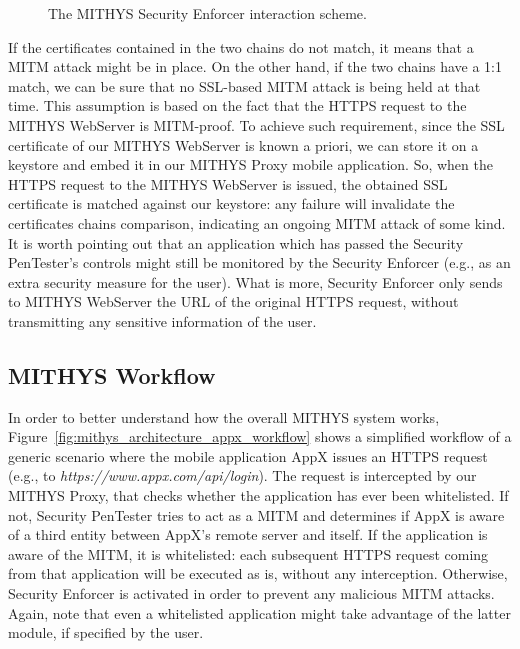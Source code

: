 \documentclass[english]{llncs}
\begin{document}
\begin{figure}[tb]
	\centering
	\caption{The MITHYS Security Enforcer interaction scheme.}
	\label{mithys_se_interaction_scheme}
\end{figure}

If the certificates contained in the two chains do not match, it means that a MITM attack might be in place. On the other hand, if the two chains have a 1:1 match, we can be sure that no SSL-based MITM attack is being held at that time. This assumption is based on the fact that the HTTPS request to the MITHYS WebServer is MITM-proof. To achieve such requirement, since the SSL certificate of our MITHYS WebServer is known a priori, we can store it on a keystore and embed it in our MITHYS Proxy mobile application. So, when the HTTPS request to the MITHYS WebServer is issued, the obtained SSL certificate is matched against our keystore: any failure will invalidate the certificates chains comparison, indicating an ongoing MITM attack of some kind.
It is worth pointing out that an application which has passed the Security PenTester's controls might still be monitored by the Security Enforcer (e.g., as an extra security measure for the user). What is more, Security Enforcer only sends to MITHYS WebServer the URL of the original HTTPS request, without transmitting any sensitive information of the user.

\subsection{MITHYS Workflow}
\label{MITHYS Workflow}

In order to better understand how the overall MITHYS system works, Figure~\ref{fig:mithys_architecture_appx_workflow} shows a simplified workflow of a generic scenario where the mobile application AppX issues an HTTPS request (e.g., to \textit{https://www.appx.com/api/login}). The request is intercepted by our MITHYS Proxy, that checks whether the application has ever been whitelisted. If not, Security PenTester tries to act as a MITM and determines if AppX is aware of a third entity between AppX's remote server and itself. If the application is aware of the MITM, it is whitelisted: each subsequent HTTPS request coming from that application will be executed as is, without any interception. Otherwise, Security Enforcer is activated in order to prevent any malicious MITM attacks. Again, note that even a whitelisted application might take advantage of the latter module, if specified by the user.
\end{document}

